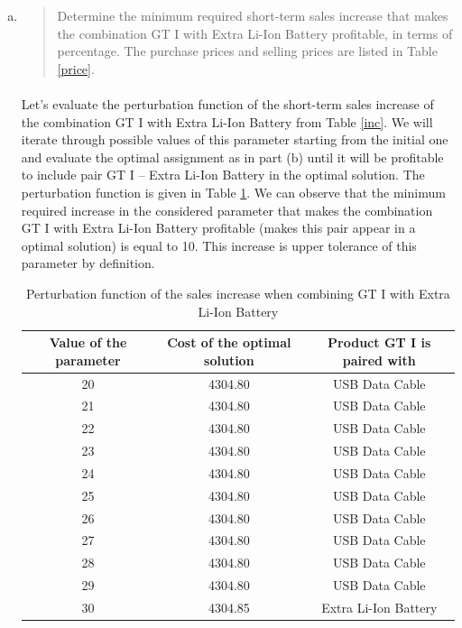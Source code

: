 \begin{enumerate}[(a)]
\setcounter{enumi}{0}
\item\begin{quote}Determine the minimum required short-term sales increase that makes the combination
GT I with Extra Li-Ion Battery profitable, in terms of percentage. The
purchase prices and selling prices are listed in Table \ref{price}.\end{quote}

	\paragraph{}
	Let's evaluate the perturbation function of the short-term sales increase of the combination GT I with Extra Li-Ion Battery from Table \ref{inc}. We will iterate through possible values of this parameter starting from the initial one and evaluate the optimal assignment as in part (b) until it will be profitable to include pair GT I -- Extra Li-Ion Battery in the optimal solution. The perturbation function is given in Table \ref{tol-5-a}. We can observe that the minimum required increase in the considered parameter that makes the combination GT I with Extra Li-Ion Battery profitable (makes this pair appear in a optimal solution) is equal to 10. This increase is upper tolerance of this parameter by definition.

\begin{table}[H]
	\centering
	\caption{Perturbation function of the sales increase when combining GT I with Extra Li-Ion Battery}
	\begin{tabular}{|c|c|c|}\hline
	Value of the parameter & Cost of the optimal solution & Product GT I is paired with \\ \hline
20 & 4304.80 & USB Data Cable \\
21 & 4304.80 & USB Data Cable \\
22 & 4304.80 & USB Data Cable \\
23 & 4304.80 & USB Data Cable \\
24 & 4304.80 & USB Data Cable \\
25 & 4304.80 & USB Data Cable \\
26 & 4304.80 & USB Data Cable \\
27 & 4304.80 & USB Data Cable \\
28 & 4304.80 & USB Data Cable \\
29 & 4304.80 & USB Data Cable \\
30 & 4304.85 & Extra Li-Ion Battery \\
	\hline
	\end{tabular}
	\label{tol-5-a}
\end{table}


\end{enumerate}
